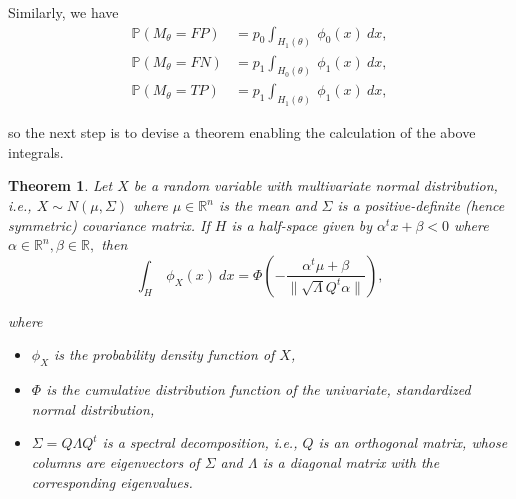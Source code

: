 \documentclass[10pt]{article}
\newtheorem{thm}{Theorem}
\newcommand{\reals}{\mathbb{R}}
\newcommand{\Prob}{\mathbb{P}}
\begin{document}
\noindent
Similarly, we have  
\begin{equation*}
\begin{split}
\Prob(M_{\theta} = FP) &= p_0 \int_{H_1(\theta)}\ \phi_0(x)\ dx,\\
\Prob(M_{\theta} = FN) &= p_1 \int_{H_0(\theta)}\ \phi_1(x)\ dx,\\
\Prob(M_{\theta} = TP) &= p_1 \int_{H_1(\theta)}\ \phi_1(x)\ dx,
\end{split}
\end{equation*}

\noindent
so the next step is to devise a theorem enabling the calculation of the above integrals. 

\begin{thm}\label{maintheorem}
Let $X$ be a random variable with multivariate normal distribution, i.e., $X \sim N(\mu, \Sigma)$ where $\mu\in\reals^n$ is the mean and $\Sigma$ is a positive-definite (hence symmetric) covariance matrix. If $H$ is a half-space given by $\alpha^t x + \beta < 0$ where $\alpha\in \reals^n, \beta \in \reals,$ then
$$\int_H\ \phi_X(x)\ dx = \Phi\left(-\frac{\alpha^t\mu + \beta}{\|\sqrt{\Lambda}Q^t\alpha\|}\right),$$

\noindent
where 
\begin{itemize}
	\item $\phi_X$ is the probability density function of $X$,
	\item $\Phi$ is the cumulative distribution function of the univariate, standardized normal distribution,
	\item $\Sigma = Q\Lambda Q^t$ is a spectral decomposition, i.e., $Q$ is an orthogonal matrix, whose columns are  eigenvectors of $\Sigma$ and $\Lambda$ is a diagonal matrix with the corresponding eigenvalues. 
\end{itemize}
\end{thm}
\end{document}
